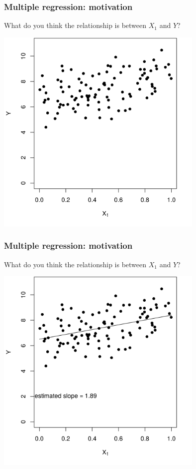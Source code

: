 \documentclass[12pt, 
hyperref={colorlinks=true, linkcolor=blue, urlcolor=cyan}]{beamer}
\begin{document}
\begin{frame}
\frametitle{Multiple regression: motivation}
What do you think the relationship is between $X_1$ and $Y$?

\centering
\includegraphics[width=0.75\textwidth]{plots/precision_simple.png}
\end{frame}

\begin{frame}
\frametitle{Multiple regression: motivation}
What do you think the relationship is between $X_1$ and $Y$?

\centering
\includegraphics[width=0.75\textwidth]{plots/precision_simple_with_line.png}
\end{frame}
\end{document}
